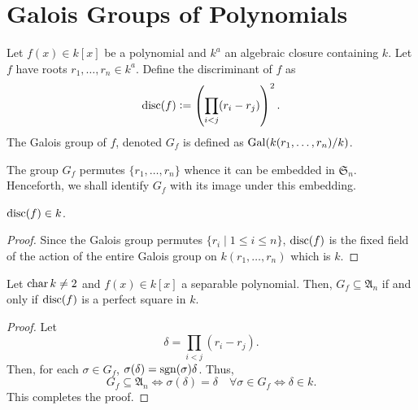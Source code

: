 \section{Galois Groups of Polynomials}

\begin{definition}
    Let $f(x)\in k[x]$ be a polynomial and $k^a$ an algebraic closure containing $k$. Let $f$ have roots $r_1,\dots,r_n\in k^a$. Define the discriminant of $f$ as 
    \begin{equation*}
        \operatorname{disc}(f) := \left(\prod_{i < j}(r_i - r_j)\right)^2.
    \end{equation*}
    The Galois group of $f$, denoted $G_f$ is defined as $\operatorname{Gal}(k(r_1,\dots,r_n)/k)$.
\end{definition}

The group $G_f$ permutes $\{r_1,\dots,r_n\}$ whence it can be embedded in $\mathfrak S_n$. Henceforth, we shall identify $G_f$ with its image under this embedding.

\begin{proposition}
    $\operatorname{disc}(f)\in k$.
\end{proposition}
\begin{proof}
    Since the Galois group permutes $\{r_i\mid 1\le i\le n\}$, $\operatorname{disc}(f)$ is the fixed field of the action of the entire Galois group on $k(r_1,\dots,r_n)$ which is $k$.
\end{proof}

\begin{theorem}
    Let $\operatorname{char} k\ne 2$ and $f(x)\in k[x]$ a separable polynomial. Then, $G_f\subseteq\mathfrak A_n$ if and only if $\operatorname{disc}(f)$ is a perfect square in $k$.
\end{theorem}
\begin{proof}
    Let 
    \begin{equation*}
        \delta = \prod_{i < j}(r_i - r_j).
    \end{equation*}
    Then, for each $\sigma\in G_f$, $\sigma(\delta) = \operatorname{sgn}(\sigma)\delta$. Thus, 
    \begin{equation*}
        G_f\subseteq\mathfrak A_n\iff \sigma(\delta) = \delta\quad\forall\sigma\in G_f\iff \delta\in k.
    \end{equation*}
    This completes the proof.
\end{proof}
